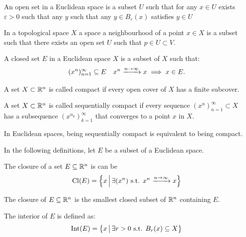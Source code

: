 \documentclass[11pt,a4paper]{article}
\DeclareMathOperator{\Cl}{Cl}
\begin{document}
\begin{definition}
  An open set in a Euclidean space is a subset $U$ such that
  for any $x \in U$ exists $\varepsilon > 0$ such that any $y$ such that
  any $y \in B_\varepsilon(x)$ satisfies $y \in U$
\end{definition}

\begin{definition}[Neighbourhood]
  In a topological space $X$ a space a neighbourhood of a point $x \in X$
  is a subset such that
  there exists an open set $U$ such that $p\in U\subset V$.
\end{definition}

\begin{definition}
  A closed set $E$ in a Euclidean space $X$ is a subset of $X$ such that:
  \[
    (x^n)_{n=1}^{\infty} \subseteq E \quad x^n \xrightarrow{n\to\infty} x
    \implies x \in E.
  \]
\end{definition}

\begin{definition}
  A set $X \subset \mathbb{R}^n$ is called compact if every open cover of $X$ has a 
  finite subcover.
\end{definition}

\begin{definition}
  A set $X \subset \mathbb{R}^n$ is called sequentially compact if
  every sequence $(x^n)_{n=1}^{\infty} \subset X$ has a subsequence 
  $(x^{n_k})_{k=1}^{\infty}$ that converges to a point $x$ in $X$.
\end{definition}

\begin{remark}
  In Euclidean spaces, being sequentially compact is equivalent to being
  compact.
\end{remark}

\noindent
In the following definitions, let $E$ be a subset of a Euclidean space.

\begin{definition}[Closure]
  The closure of a set $E \subseteq \mathbb{R}^n$ is can be 
  \[
    \Cl(E) = \set{x \bmid \exists (x^n) \st 
    x^n \taking{n\to\infty} x}
  \]
\end{definition}

\begin{proposition}
  The closure of $E \subseteq \mathbb{R}^n$ is the smallest closed subset
  of $\mathbb{R}^n$ containing $E$.
\end{proposition}

\begin{definition}[Interior]
  The interior of $E$ is defined as:
  \[
    \operatorname{Int}(E) =
    \left\{x \,\middle\vert\, \exists r > 0 \text{ s.t. } B_r(x) \subseteq X\right\}
  \]
\end{definition}
\end{document}
